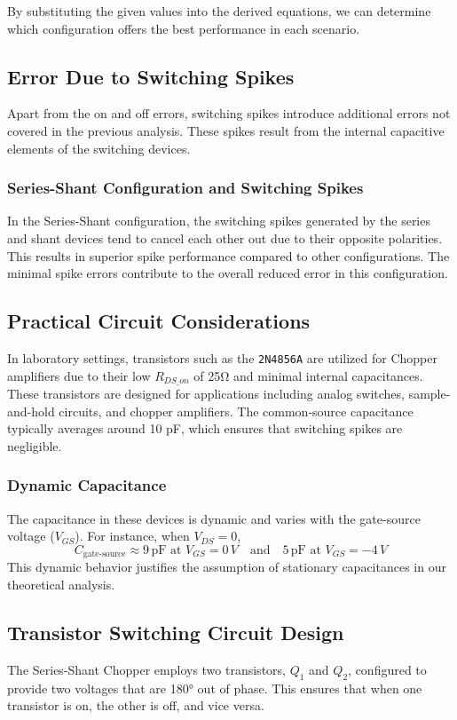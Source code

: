 \noindent By substituting the given values into the derived equations, we can determine which configuration offers the best performance in each scenario.

\subsection{Error Due to Switching Spikes}
Apart from the on and off errors, switching spikes introduce additional errors not covered in the previous analysis. These spikes result from the internal capacitive elements of the switching devices.

\subsubsection{Series-Shant Configuration and Switching Spikes}
In the Series-Shant configuration, the switching spikes generated by the series and shant devices tend to cancel each other out due to their opposite polarities. This results in superior spike performance compared to other configurations. The minimal spike errors contribute to the overall reduced error in this configuration.

\subsection{Practical Circuit Considerations}
In laboratory settings, transistors such as the \texttt{2N4856A} are utilized for Chopper amplifiers due to their low \( R_{DS\_on} \) of 25Ω and minimal internal capacitances. These transistors are designed for applications including analog switches, sample-and-hold circuits, and chopper amplifiers. The common-source capacitance typically averages around 10 pF, which ensures that switching spikes are negligible.

\subsubsection{Dynamic Capacitance}
The capacitance in these devices is dynamic and varies with the gate-source voltage (\( V_{GS} \)). For instance, when \( V_{DS} = 0 \),
\[
C_{\text{gate-source}} \approx 9\,\text{pF at } V_{GS} = 0\,V \quad \text{and} \quad 5\,\text{pF at } V_{GS} = -4\,V
\]
This dynamic behavior justifies the assumption of stationary capacitances in our theoretical analysis.

\subsection{Transistor Switching Circuit Design}
The Series-Shant Chopper employs two transistors, \( Q_1 \) and \( Q_2 \), configured to provide two voltages that are 180° out of phase. This ensures that when one transistor is on, the other is off, and vice versa.

